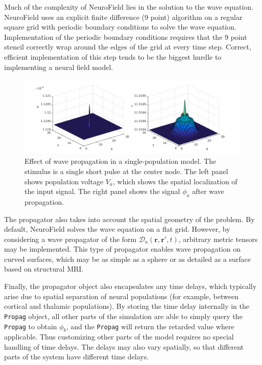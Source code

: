 \documentclass[preprint,review,10pt,authoryear,letterpaper]{elsarticle}
\begin{document}
Much of the complexity of NeuroField lies in the solution to the wave equation. NeuroField uses an explicit finite difference (9 point) algorithm on a regular square grid with periodic boundary conditions to solve the wave equation. Implementation of the periodic boundary conditions requires that the 9 point stencil correctly wrap around the edges of the grid at every time step. Correct, efficient implementation of this step tends to be the biggest hurdle to implementing a neural field model. 


\begin{figure}[!b]
\begin{center}
\includegraphics[width=1\columnwidth]{wave_comparison}
\caption{Effect of wave propagation in a single-population model. The stimulus is a single short pulse at the center node. The left panel shows population voltage $V_a$, which shows the spatial localization of the input signal. The right panel shows the signal $\phi_a$ after wave propagation.}
\label{fig:wave_comparison}
\end{center}
\end{figure}

The propagator also takes into account the spatial geometry of the problem. By default, NeuroField solves the wave equation on a flat grid. However, by considering a wave propagator of the form $\mathcal{D}_a(\mathbf{r},\mathbf{r'},t)$, arbitrary metric tensors may be implemented. This type of propagator enables wave propagation on curved surfaces, which may be as simple as a sphere or as detailed as a surface based on structural MRI. 


Finally, the propagator object also encapsulates any time delays, which typically arise due to spatial separation of neural populations (for example, between cortical and thalamic populations). By storing the time delay internally in the \texttt{Propag} object, all other parts of the simulation are able to simply query the \texttt{Propag} to obtain $\phi_b$, and the \texttt{Propag} will return the retarded value where applicable. Thus customizing other parts of the model requires no special handling of time delays. The delays may also vary spatially, so that different parts of the system have different time delays. 
\end{document}
